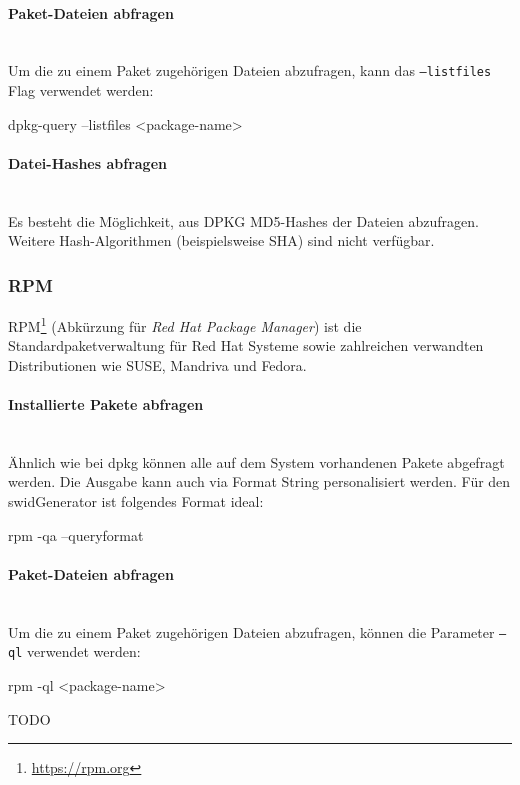 \paragraph{Paket-Dateien abfragen} \hspace{0pt} \\

\noindent Um die zu einem Paket zugehörigen Dateien abzufragen, kann das
\texttt{---listfiles} Flag verwendet werden:

\begin{bashcode}
dpkg-query --listfiles <package-name>
\end{bashcode}

\paragraph{Datei-Hashes abfragen} \hspace{0pt} \\

\noindent Es besteht die Möglichkeit, aus DPKG MD5-Hashes der Dateien abzufragen. Weitere
Hash-Algorithmen (beispielsweise SHA) sind nicht verfügbar.


\subsubsection{RPM}

RPM\footnote{\url{https://rpm.org}} (Abkürzung für
\textit{Red Hat Package Manager}) ist die Standardpaketverwaltung für Red Hat Systeme sowie zahlreichen verwandten Distributionen wie SUSE, Mandriva und Fedora.

\paragraph{Installierte Pakete abfragen} \hspace{0pt} \\

\noindent Ähnlich wie bei dpkg können alle auf dem System vorhandenen Pakete abgefragt werden. Die Ausgabe kann auch via Format String personalisiert werden. Für den swidGenerator ist folgendes Format ideal:

\begin{bashcode}
rpm -qa --queryformat %
\end{bashcode}

\paragraph{Paket-Dateien abfragen} \hspace{0pt} \\

\noindent Um die zu einem Paket zugehörigen Dateien abzufragen, können die Parameter \texttt{--ql} verwendet werden:

\begin{bashcode}
rpm -ql <package-name>
\end{bashcode}

\noindent TODO
